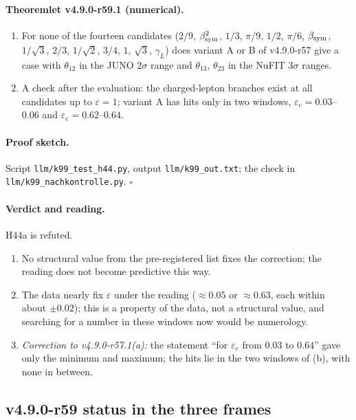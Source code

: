 \paragraph{Theoremlet v4.9.0-r59.1 (numerical).}
\begin{enumerate}[leftmargin=2em]
\item[(a)] For none of the fourteen candidates (\(2/9\), \(\beta_{\rm sym}^2\), \(1/3\), \(\pi/9\), \(1/2\), \(\pi/6\), \(\beta_{\rm sym}\), \(1/\sqrt3\), \(2/3\), \(1/\sqrt2\), \(3/4\), \(1\),
\(\sqrt3\), \(\gamma_L\)) does variant A or B of v4.9.0-r57 give a case with \(\theta_{12}\) in the JUNO \(2\sigma\) range and \(\theta_{13}\), \(\theta_{23}\) in the NuFIT
\(3\sigma\) ranges.
\item[(b)] A check after the evaluation: the charged-lepton branches exist at all candidates up to \(\varepsilon=1\); variant A has hits only in two windows,
\(\varepsilon_e=0.03\)--\(0.06\) and \(\varepsilon_e=0.62\)--\(0.64\).
\end{enumerate}

\paragraph{Proof sketch.}
Script \texttt{llm/k99\_test\_h44.py}, output \texttt{llm/k99\_out.txt}; the check in \texttt{llm/k99\_nachkontrolle.py}.  \(\square\)

\paragraph{Verdict and reading.}
H44a is refuted.
\begin{enumerate}[leftmargin=2em]
\item No structural value from the pre-registered list fixes the correction; the reading does not become predictive this way.
\item The data nearly fix \(\varepsilon\) under the reading (\(\approx0.05\) or \(\approx0.63\), each within about \(\pm0.02\)); this is a property of the data, not a structural
value, and searching for a number in these windows now would be numerology.
\item \emph{Correction to v4.9.0-r57.1(a):} the statement ``for \(\varepsilon_e\) from \(0.03\) to \(0.64\)'' gave only the minimum and maximum; the hits lie in the two windows
of (b), with none in between.
\end{enumerate}

\subsection*{v4.9.0-r59 status in the three frames}
\label{subsec:v490-r59-frames}

